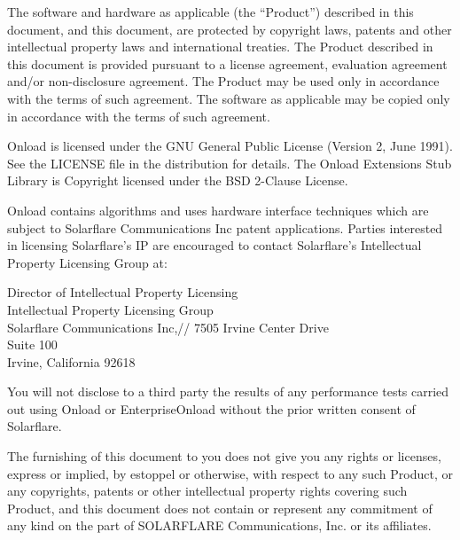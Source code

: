 The software and hardware as applicable (the “Product”) described in this 
document, and this document, are protected by copyright laws, patents and 
other intellectual property laws and international treaties. The Product 
described in this document is provided pursuant to a license agreement, 
evaluation agreement and/or non-disclosure agreement. The Product may be 
used only in accordance with the terms of such agreement. The software as 
applicable may be copied only in accordance with the terms of such 
agreement.

Onload is licensed under the GNU General Public License (Version 2, June 
1991). See the LICENSE file in the distribution for details. The Onload 
Extensions Stub Library is Copyright licensed under the BSD 2-Clause 
License.

Onload contains algorithms and uses hardware interface techniques which 
are subject to Solarflare Communications Inc patent applications. Parties 
interested in licensing Solarflare's IP are encouraged to contact 
Solarflare's Intellectual Property Licensing Group at:

Director of Intellectual Property Licensing\\
Intellectual Property Licensing Group\\
Solarflare Communications Inc,//
7505 Irvine Center Drive\\
Suite 100\\
Irvine, California 92618

You will not disclose to a third party the results of any performance 
tests carried out using Onload or EnterpriseOnload without the prior 
written consent of Solarflare.

The furnishing of this document to you does not give you any rights or 
licenses, express or implied, by estoppel or otherwise, with respect to 
any such Product, or any copyrights, patents or other intellectual 
property rights covering such Product, and this document does not contain 
or represent any commitment of any kind on the part of SOLARFLARE 
Communications, Inc. or its affiliates.

